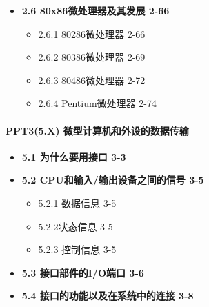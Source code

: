 \documentclass[zihao=5,linespread=1,heading=false,autoindent=0pt]{ctexart}
\newenvironment{citemize}%
{\begin{itemize}[parsep=0pt,itemsep=0pt,topsep=0pt,partopsep=0pt,labelwidth=1em,leftmargin=*]}
{\end{itemize}}
\theoremstyle{exampstyle} \newtheorem{definition}{定义}[section]
\theoremstyle{exampstyle} \newtheorem{example}{例}[section]
\theoremstyle{exampstyle} \newtheorem{theorem}{定理}[section]
\theoremstyle{exampstyle} \newtheorem{lemma}{引理}[section]
\theoremstyle{exampstyle} \newtheorem{myproof}{证明}[section]
\begin{document}
\begin{multicols*}{3}
\begin{citemize}
\begin{citemize}
\begin{citemize}
          \begin{citemize}
           
          \item
            和存储器统一编址 2-62
          \item
            I/O独立编址 2-64
          \end{citemize}
        \end{citemize}
      \end{citemize}
    \item
      \textbf{2.6 80x86微处理器及其发展 2-66}
    
      \begin{citemize}
       
      \item
        2.6.1 80286微处理器 2-66
      \item
        2.6.2 80386微处理器 2-69
      \item
        2.6.3 80486微处理器 2-72
      \item
        2.6.4 Pentium微处理器 2-74
      \end{citemize}
    \end{citemize}
    
    \hypertarget{ppt35.x-ux5faeux578bux8ba1ux7b97ux673aux548cux5916ux8bbeux7684ux6570ux636eux4f20ux8f93}{%
    \paragraph{PPT3(5.X)
    微型计算机和外设的数据传输}\label{ppt35.x-ux5faeux578bux8ba1ux7b97ux673aux548cux5916ux8bbeux7684ux6570ux636eux4f20ux8f93}}
    
    \begin{citemize}
     
    \item
      \textbf{5.1 为什么要用接口 3-3}
    \item
      \textbf{5.2 CPU和输入/输出设备之间的信号 3-5}
    
      \begin{citemize}
       
      \item
        5.2.1 数据信息 3-5
      \item
        5.2.2状态信息 3-5
      \item
        5.2.3 控制信息 3-5
      \end{citemize}
    \item
      \textbf{5.3 接口部件的I/O端口 3-6}
    \item
      \textbf{5.4 接口的功能以及在系统中的连接 3-8}
    

\end{citemize}
\end{multicols*}
\end{document}
